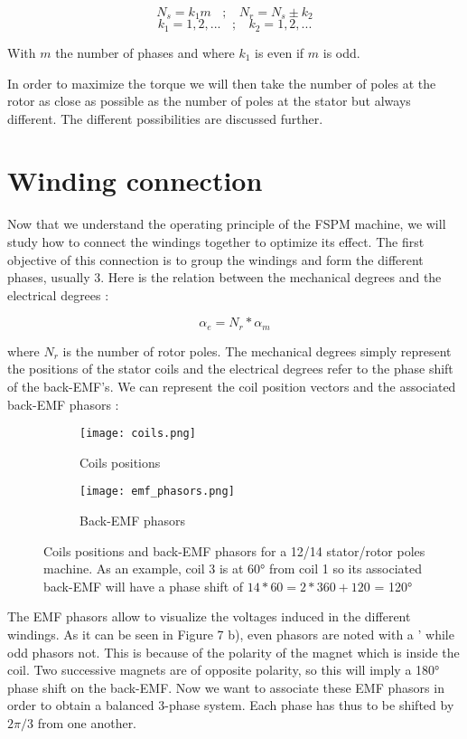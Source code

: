 $$ N_{s} = k_{1}m ~~~~;~~~~ N_{r} = N_{s} \pm k_{2} $$
$$ k_{1} = 1,2,... ~~~~;~~~~ k_{2} = 1,2,... $$

With $m$ the number of phases and where $k_{1}$ is even if $m$ is odd.

In order to maximize the torque we will then take the number of poles at the rotor as close as possible as the number of poles at the stator but always different. The different possibilities are discussed further.

\section{Winding connection}
Now that we understand the operating principle of the FSPM machine, we will study how to connect the windings together to optimize its effect. The first objective of this connection is to group the windings and form the different phases, usually 3. Here is the relation between the mechanical degrees and the electrical degrees :

$$ \alpha_e = N_r * \alpha_m$$

where $N_r$ is the number of rotor poles. The mechanical degrees simply represent the positions of the stator coils and the electrical degrees refer to the phase shift of the back-EMF's. We can represent the coil position vectors and the associated back-EMF phasors :

\begin{figure}[H]
\centering
\begin{subfigure}{.5\textwidth}
  \centering
  \texttt{[image: coils.png]}
  \caption{Coils positions}
\end{subfigure}%
\begin{subfigure}{.5\textwidth}
  \centering
  \texttt{[image: emf\_phasors.png]}
  \caption{Back-EMF phasors}
\end{subfigure}
\captionsetup{justification=centering}
\caption{Coils positions and back-EMF phasors for a 12/14 stator/rotor poles machine. As an example, coil 3 is at 60° from coil 1 so its associated back-EMF will have a phase shift of $14*60 = 2*360 + 120$ = 120°}
\end{figure}

The EMF phasors allow to visualize the voltages induced in the different windings.
As it can be seen in Figure 7 b), even phasors are noted with a ' while odd phasors not. This is because of the polarity of the magnet which is inside the coil. Two successive magnets are of opposite polarity, so this will imply a 180° phase shift on the back-EMF. Now we want to associate these EMF phasors in order to obtain a balanced 3-phase system. Each phase has thus to be shifted by $2\pi/3$ from one another. 

